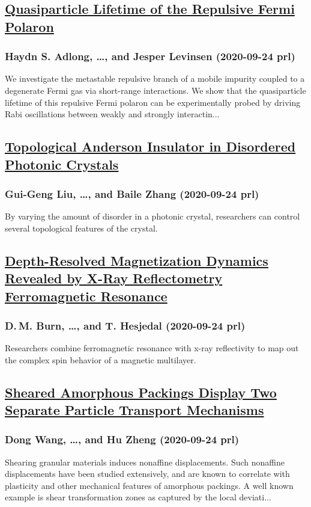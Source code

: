 \subsection*{\href{http://link.aps.org/doi/10.1103/PhysRevLett.125.133401}{Quasiparticle Lifetime of the Repulsive Fermi Polaron}}
\subsubsection*{Haydn S. Adlong, \dots, and Jesper Levinsen (2020-09-24 prl)}
We investigate the metastable repulsive branch of a mobile impurity coupled to a degenerate Fermi gas via short-range interactions. We show that the quasiparticle lifetime of this repulsive Fermi polaron can be experimentally probed by driving Rabi oscillations between weakly and strongly interactin...
\subsection*{\href{http://link.aps.org/doi/10.1103/PhysRevLett.125.133603}{Topological Anderson Insulator in Disordered Photonic Crystals}}
\subsubsection*{Gui-Geng Liu, \dots, and Baile Zhang (2020-09-24 prl)}
By varying the amount of disorder in a photonic crystal, researchers can control several topological features of the crystal.
\subsection*{\href{http://link.aps.org/doi/10.1103/PhysRevLett.125.137201}{Depth-Resolved Magnetization Dynamics Revealed by X-Ray Reflectometry Ferromagnetic Resonance}}
\subsubsection*{D. M. Burn, \dots, and T. Hesjedal (2020-09-24 prl)}
Researchers combine ferromagnetic resonance with x-ray reflectivity to map out the complex spin behavior of a magnetic multilayer.
\subsection*{\href{http://link.aps.org/doi/10.1103/PhysRevLett.125.138001}{Sheared Amorphous Packings Display Two Separate Particle Transport Mechanisms}}
\subsubsection*{Dong Wang, \dots, and Hu Zheng (2020-09-24 prl)}
Shearing granular materials induces nonaffine displacements. Such nonaffine displacements have been studied extensively, and are known to correlate with plasticity and other mechanical features of amorphous packings. A well known example is shear transformation zones as captured by the local deviati...
